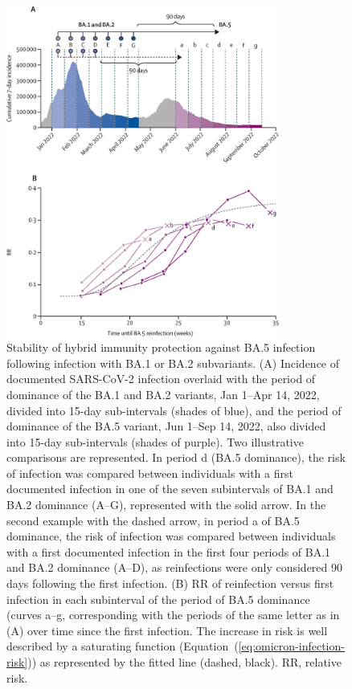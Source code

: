 \begin{figure}
    \centering
    \includegraphics[width=0.8\textwidth]{chapter/2023-covid19-02/figures/fig1-stability-hybrid-immunity}
    \caption[Stability of hybrid immunity protection against BA.5 infection following infection with BA.1 or BA.2 subvariants]{Stability of hybrid immunity protection against BA.5 infection following infection with BA.1 or BA.2 subvariants. (A) Incidence of documented SARS-CoV-2 infection overlaid with the period of dominance of the BA.1 and BA.2 variants, Jan 1--Apr 14, 2022, divided into 15-day sub-intervals (shades of blue), and the period of dominance of the BA.5 variant, Jun 1--Sep 14, 2022, also divided into 15-day sub-intervals (shades of purple). Two illustrative comparisons are represented. In period d (BA.5 dominance), the risk of infection was compared between individuals with a first documented infection in one of the seven subintervals of BA.1 and BA.2 dominance (A--G), represented with the solid arrow. In the second example with the dashed arrow, in period a of BA.5 dominance, the risk of infection was compared between individuals with a first documented infection in the first four periods of BA.1 and BA.2 dominance (A--D), as reinfections were only considered 90 days following the first infection. (B) RR of reinfection versus first infection in each subinterval of the period of BA.5 dominance (curves a--g, corresponding with the periods of the same letter as in (A) over time since the first infection. The increase in risk is well described by a saturating function (Equation~(\ref{eq:omicron-infection-risk})) as represented by the fitted line (dashed, black). RR, relative risk.}
    \label{fig:fig1-stability-hybrid-immunity}
\end{figure}

